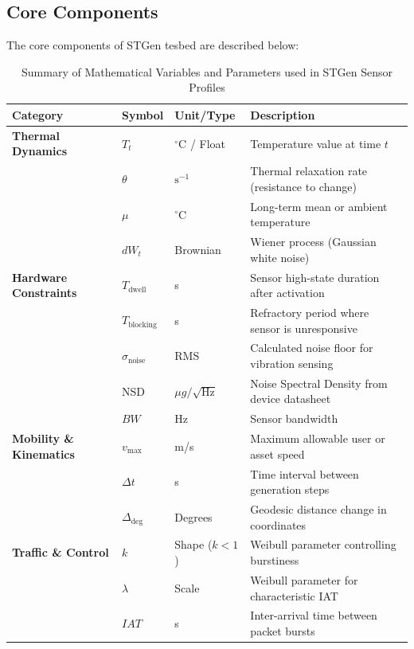 \documentclass[jsan,article,submit,moreauthors,pdftex]{Definitions/mdpi}
\begin{document}
\subsection{Core Components}
\label{core-components}

The core components of STGen tesbed are described below:

\begin{table}[ht]
\centering
\caption{Summary of Mathematical Variables and Parameters used in STGen Sensor Profiles}
\label{tab:nomenclature}
\begin{tabularx}{\textwidth}{@{}lllX@{}}
\toprule
\textbf{Category} & \textbf{Symbol} & \textbf{Unit/Type} & \textbf{Description} \\ \midrule
\textbf{Thermal Dynamics} \cite{uhlenbeck1930} & $T_t$ & $^\circ\text{C}$ / Float & Temperature value at time $t$  \\
 & $\theta$ & $\text{s}^{-1}$ & Thermal relaxation rate (resistance to change)  \\
 & $\mu$ & $^\circ\text{C}$ & Long-term mean or ambient temperature \\
 & $dW_t$ & Brownian & Wiener process (Gaussian white noise)  \\ \midrule
\textbf{Hardware Constraints} \cite{hcsr501, mpu6050}  & $T_{\text{dwell}}$ & s & Sensor high-state duration after activation \\
 & $T_{\text{blocking}}$ & s & Refractory period where sensor is unresponsive  \\
 & $\sigma_{\text{noise}}$ & RMS & Calculated noise floor for vibration sensing  \\
 & NSD & $\mu g/\sqrt{\text{Hz}}$ & Noise Spectral Density from device datasheet  \\
 & $BW$ & Hz & Sensor bandwidth  \\ \midrule
\textbf{Mobility \& Kinematics} \cite{bettstetter2001, snyder1987map}  & $v_{\max}$ & m/s & Maximum allowable user or asset speed \\
 & $\Delta t$ & s & Time interval between generation steps \\
 & $\Delta_{\text{deg}}$ & Degrees & Geodesic distance change in coordinates  \\ \midrule
\textbf{Traffic \& Control} \cite{6662948} & $k$ & Shape ($k < 1$) & Weibull parameter controlling burstiness  \\
 & $\lambda$ & Scale & Weibull parameter for characteristic IAT  \\
 & $IAT$ & s & Inter-arrival time between packet bursts \\ \bottomrule
\end{tabularx}
\end{table}
\end{document}
